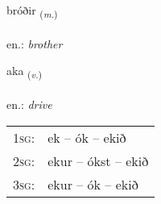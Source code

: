 \documentclass[frontgrid, backgrid]{flacards}\usepackage[]{graphicx}\usepackage[]{xcolor}
\begin{document}
\renewcommand{\blhead}{\vskip5pt {\small\bfseries\footnotesize Nafnorð | Noun }}
\renewcommand{\bcfoot}{\vskip5pt \hspace{2pt}{\small\bfseries\footnotesize 1K}}


{bróðir \small{\textsubscript{(\textit{m.})}} \\[1ex] %
\textphonetic{[prouːðɪr]} \\
en.: \emph{brother} \\  [2ex]
\renewcommand*{\arraystretch}{0.8}
}

\renewcommand{\flhead}{\vskip5pt \fboxsep=0pt {\small\bfseries\footnotesize Sagnorð | Verb}}
\renewcommand{\fcfoot}{\vskip5pt \fboxsep=0pt \hspace{2pt}{\small\bfseries\footnotesize 1K}}

\renewcommand{\blhead}{\vskip5pt {\small\bfseries\footnotesize Sagnorð | Verb }}
\renewcommand{\bcfoot}{\vskip5pt \hspace{2pt}{\small\bfseries\footnotesize 1K}}


{aka \small{\textsubscript{(\textit{v.})}} \\[1ex] %
\textphonetic{[aːka]} \\
en.: \emph{drive} \\  [2ex]
\renewcommand*{\arraystretch}{0.8}
\begin{tabular}{p{1cm}l}
\textsc{1sg}: & ek -- ók -- ekið \\ 
\textsc{2sg}: & ekur -- ókst -- ekið \\ 
\textsc{3sg}: & ekur -- ók -- ekið \\ 
\end{tabular}
}

\renewcommand{\flhead}{\vskip5pt \fboxsep=0pt {\small\bfseries\footnotesize Sagnorð | Verb}}
\renewcommand{\fcfoot}{\vskip5pt \fboxsep=0pt \hspace{2pt}{\small\bfseries\footnotesize 1K}}
\end{document}

